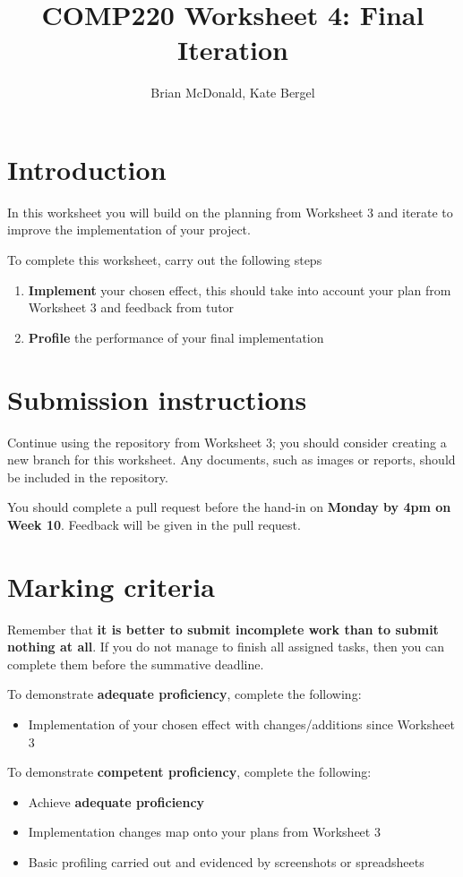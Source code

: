 \documentclass{../../../fal_assignment}
\title{COMP220 Worksheet 4: Final Iteration}
\author{Brian McDonald, Kate Bergel}
\begin{document}
\maketitle

\section*{Introduction}

In this worksheet you will build on the planning from Worksheet 3 and iterate to improve the implementation of your project.

To complete this worksheet, carry out the following steps
\begin{enumerate}[label=(\alph*)]
	\item \textbf{Implement} your chosen effect, this should take into account your plan from Worksheet 3 and feedback from tutor
	\item \textbf{Profile} the performance of your final implementation
\end{enumerate}

\section*{Submission instructions}

Continue using the repository from Worksheet 3; you should consider creating a new branch for this worksheet. Any documents, such as images or reports, should be included in the repository.

You should complete a pull request before the hand-in on \textbf{Monday by 4pm on Week 10}. Feedback will be given in the pull request.

\section*{Marking criteria}

Remember that \textbf{it is better to submit incomplete work than to submit nothing at all}. If you do not manage to finish all assigned tasks, then you can complete them before the summative deadline.

To demonstrate \textbf{adequate proficiency}, complete the following:
\begin{itemize}
	\item Implementation of your chosen effect with changes/additions since Worksheet 3
\end{itemize} 

To demonstrate \textbf{competent proficiency}, complete the following:
\begin{itemize}
	\item Achieve \textbf{adequate proficiency}
	\item Implementation changes map onto your plans from Worksheet 3
	\item Basic profiling carried out and evidenced by screenshots or spreadsheets
\end{itemize}
\end{document}
